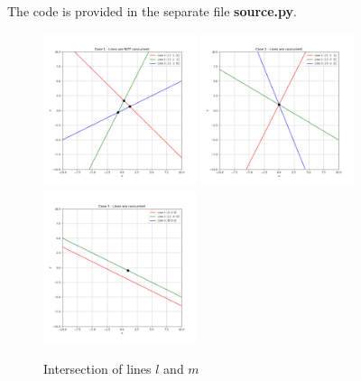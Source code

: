 The code is provided in the separate file \textbf{source.py}.

\begin{figure}[H]
    \centering
    \includegraphics[width=0.4\textwidth]{../Assets/Case_1.png}
    \includegraphics[width=0.4\textwidth]{../Assets/Case_2.png}
    \includegraphics[width=0.4\textwidth]{../Assets/Case_3.png}
    \caption{Intersection of lines \( l \) and \( m \)}
    \label{fig:intersection}
\end{figure}
